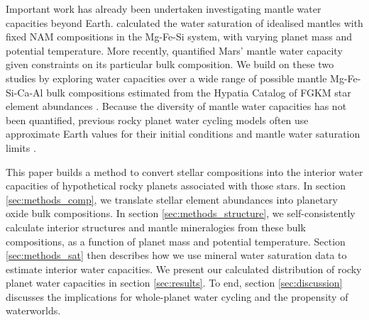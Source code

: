 \documentclass[fleqn,usenatbib]{mnras}
\begin{document}
Important work has already been undertaken investigating mantle water capacities beyond Earth. \citet{shah_internal_2021} calculated the water saturation of idealised mantles with fixed NAM compositions in the Mg-Fe-Si system, with varying planet mass and potential temperature. %
More recently, \citet{dong_water_2022} quantified Mars' mantle water capacity given constraints on its particular bulk composition. We build on these two studies by exploring water capacities over a wide range of possible mantle Mg-Fe-Si-Ca-Al bulk compositions estimated from the Hypatia Catalog of FGKM star element abundances \citep{hinkel_stellar_2014}. %
Because the diversity of mantle water capacities has not been quantified, previous rocky planet water cycling models often use approximate Earth values for their initial conditions and mantle water saturation limits \citep[e.g.,][]{cowan_water_2014, schaefer_persistence_2015, komacek_effect_2016, moore_keeping_2020}. %

This paper builds a method to convert stellar compositions into the interior water capacities of hypothetical rocky planets associated with those stars. In section \ref{sec:methods_comp}, we translate stellar element abundances into planetary oxide bulk compositions. In section \ref{sec:methods_structure}, we self-consistently calculate interior structures and mantle mineralogies from these bulk compositions, as a function of planet mass and potential temperature. Section \ref{sec:methods_sat} then describes how we use mineral water saturation data to estimate interior water capacities. We present our calculated distribution of rocky planet water capacities in section \ref{sec:results}. To end, section \ref{sec:discussion} discusses the implications for whole-planet water cycling and the propensity of waterworlds.   
\end{document}
